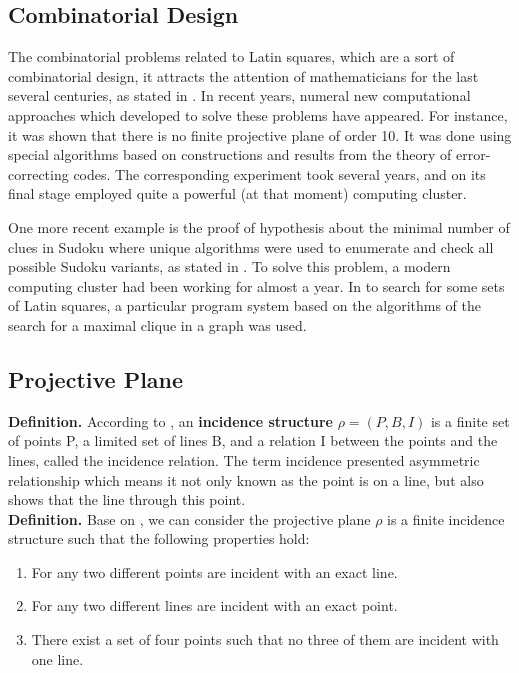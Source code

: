 \documentclass[12pt]{article}
\begin{document}
\subsection{Combinatorial Design}

The combinatorial problems related to Latin squares, which are a sort of combinatorial design, it attracts the attention of mathematicians for the last several centuries, as stated in \cite{ref14}. In recent years, numeral new computational approaches which developed to solve these problems have appeared. For instance, it was shown that there is no finite projective plane of order 10. It was done using special algorithms based on constructions and results from the theory of error-correcting codes. The corresponding experiment took several years, and on its final stage employed quite a powerful (at that moment) computing cluster.

One more recent example is the proof of hypothesis about the minimal number of clues in Sudoku where unique algorithms were used to enumerate and check all possible Sudoku variants, as stated in \cite{ref14}. To solve this problem, a modern computing cluster had been working for almost a year. In to search for some sets of Latin squares, a particular program system based on the algorithms of the search for a maximal clique in a graph was used.

\subsection{Projective Plane}
\textbf{Definition.} According to \cite{ref1}, an \textbf{incidence structure} $\rho = (P, B, I)$ is a finite set of points P, a limited set of lines B, and a relation I between the points and the lines, called the incidence relation. The term incidence presented asymmetric relationship which means it not only known as the point is on a line, but also shows that the line through this point.\\ 

\textbf{Definition.} Base on \cite{ref1}, we can consider the projective plane $\rho$ is a finite incidence structure such that the following properties hold:
\begin{enumerate}[1.]
\item For any two different points are incident with an exact line.
\item For any two different lines are incident with an exact point.
\item There exist a set of four points such that no three of them are incident with one line.
\end{enumerate}
\end{document}

